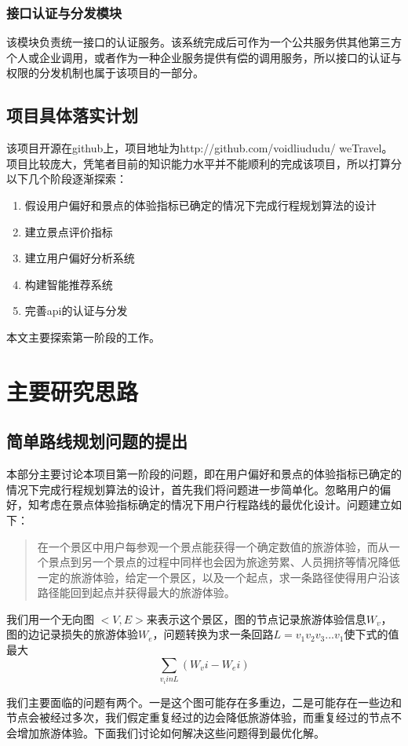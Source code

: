 \documentclass[titlepage]{article}
\begin{document}
\subsubsection{接口认证与分发模块}
该模块负责统一接口的认证服务。该系统完成后可作为一个公共服务供其他第三方个人或企业调用，或者作为一种企业服务提供有偿的调用服务，所以接口的认证与权限的分发机制也属于该项目的一部分。
\subsection{项目具体落实计划}
该项目开源在github上，项目地址为http://github.com/voidliududu/ weTravel。项目比较庞大，凭笔者目前的知识能力水平并不能顺利的完成该项目，所以打算分以下几个阶段逐渐探索：
\begin{enumerate}
\item 假设用户偏好和景点的体验指标已确定的情况下完成行程规划算法的设计
\item 建立景点评价指标
\item 建立用户偏好分析系统
\item 构建智能推荐系统
\item 完善api的认证与分发
\end{enumerate}

本文主要探索第一阶段的工作。

\section{主要研究思路}
\subsection{简单路线规划问题的提出}
本部分主要讨论本项目第一阶段的问题，即在用户偏好和景点的体验指标已确定的情况下完成行程规划算法的设计，首先我们将问题进一步简单化。忽略用户的偏好，知考虑在景点体验指标确定的情况下用户行程路线的最优化设计。问题建立如下：
\begin{quote}
在一个景区中用户每参观一个景点能获得一个确定数值的旅游体验，而从一个景点到另一个景点的过程中同样也会因为旅途劳累、人员拥挤等情况降低一定的旅游体验，给定一个景区，以及一个起点，求一条路径使得用户沿该路径能回到起点并获得最大的旅游体验。
\end{quote}

我们用一个无向图 $<V,E>$来表示这个景区，图的节点记录旅游体验信息$W_v$，图的边记录损失的旅游体验$W_e$，问题转换为求一条回路$L = v_1 v_2 v_3 ... v_1$使下式的值最大$$\sum_{v_i in L} (W_vi - W_ei)$$

我们主要面临的问题有两个。一是这个图可能存在多重边，二是可能存在一些边和节点会被经过多次，我们假定重复经过的边会降低旅游体验，而重复经过的节点不会增加旅游体验。下面我们讨论如何解决这些问题得到最优化解。
\end{document}
